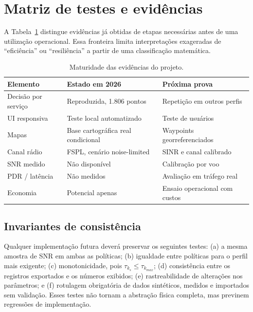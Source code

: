 \documentclass[10pt,a4paper,twocolumn]{article}
\begin{document}
\section{Matriz de testes e evidências}
A Tabela~\ref{tab:evidence} distingue evidências já obtidas de etapas necessárias antes de uma utilização operacional. Essa fronteira limita interpretações exageradas de ``eficiência'' ou ``resiliência'' a partir de uma classificação matemática.
\begin{table}[H]\centering\scriptsize\caption{Maturidade das evidências do projeto.}\label{tab:evidence}\begin{tabular}{@{}p{2.7cm}p{2.15cm}p{2.3cm}@{}}\toprule Elemento & Estado em 2026 & Próxima prova\\\midrule
Decisão por serviço & Reproduzida, 1.806 pontos & Repetição em outros perfis\\
UI responsiva & Teste local automatizado & Teste de usuários\\
Mapas & Base cartográfica real condicional & Waypoints georreferenciados\\
Canal rádio & FSPL, cenário noise-limited & SINR e canal calibrado\\
SNR medido & Não disponível & Calibração por voo\\
PDR / latência & Não medidos & Avaliação em tráfego real\\
Economia & Potencial apenas & Ensaio operacional com custos\\\bottomrule\end{tabular}\end{table}
\subsection{Invariantes de consistência}
Qualquer implementação futura deverá preservar os seguintes testes: (a) a mesma amostra de SNR em ambas as políticas; (b) igualdade entre políticas para o perfil mais exigente; (c) monotonicidade, pois $\tau_{k_s}\leq \tau_{k_{max}}$; (d) consistência entre os registros exportados e os números exibidos; (e) rastreabilidade de alterações nos parâmetros; e (f) rotulagem obrigatória de dados sintéticos, medidos e importados sem validação. Esses testes não tornam a abstração física completa, mas previnem regressões de implementação.
\end{document}
